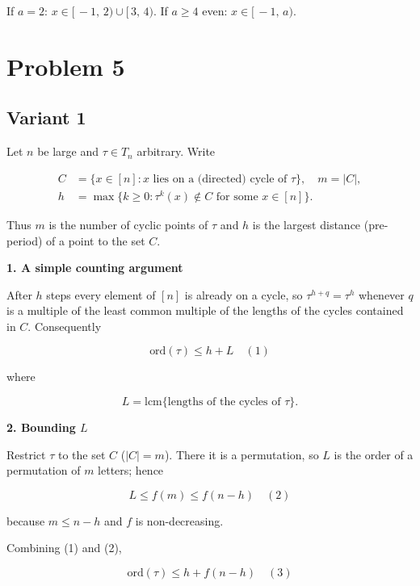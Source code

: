 \documentclass[12pt,a4paper]{article}
\theoremstyle{definition}
\begin{document}
        If $a=2$: $x\in[\,-1,\,2)\cup[\,3,\,4)$.
        If $a\geq 4$ even: $x\in[\,-1,\,a)$.


\section{Problem 5}
\subsection{Variant 1}
    Let $n$ be large and $\tau \in T_n$ arbitrary.
    Write

    \begin{align}
        C &= \{x \in [n] : x \text{ lies on a (directed) cycle of } \tau\}, \quad m = |C|, \\
        h &= \max \{ k \geq 0 : \tau^k(x) \notin C \text{ for some } x \in [n] \}.
    \end{align}

    Thus $m$ is the number of cyclic points of $\tau$ and $h$ is the largest
    distance (pre-period) of a point to the set $C$.

    \textbf{1. A simple counting argument}

    After $h$ steps every element of $[n]$ is already on a cycle, so
    $\tau^{h+q} = \tau^h$ whenever $q$ is a multiple of the least common multiple
    of the lengths of the cycles contained in $C$. Consequently

    \begin{equation}
        \text{ord}(\tau) \leq h + L \quad {(1)}
    \end{equation}

    where

    \begin{equation*}
        L = \text{lcm}\{\text{lengths of the cycles of } \tau\}.
    \end{equation*}

    \textbf{2. Bounding $L$}

    Restrict $\tau$ to the set $C$ ($|C| = m$).
    There it is a permutation, so $L$ is the order of a permutation of $m$
    letters; hence

    \begin{equation}
        L \leq f(m) \leq f(n-h) \quad {(2)}
    \end{equation}

    because $m \leq n-h$ and $f$ is non-decreasing.

    Combining (1) and (2),

    \begin{equation}
        \text{ord}(\tau) \leq h + f(n-h) \quad {(3)}
    \end{equation}
\end{document}

